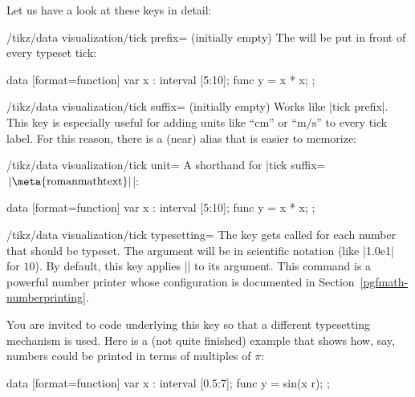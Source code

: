 Let us have a look at these keys in detail:

\begin{key}{/tikz/data visualization/tick prefix= (initially \normalfont empty)}
    The  will be put in front of every typeset tick:
\begin{codeexample}[]
\tikz \datavisualization
  [scientific axes, all axes={ticks=few, length=2.5cm},
   x axis={ticks={tick prefix=$\langle$, tick suffix=$]$}},
   visualize as line]
  data [format=function] {
    var x : interval [5:10];
    func y = \value x * \value x;
  };
\end{codeexample}
\end{key}

\begin{key}{/tikz/data visualization/tick suffix= (initially \normalfont empty)}
    Works like |tick prefix|. This key is especially useful for adding units
    like ``cm'' or ``$\mathrm m/\mathrm s$'' to every tick label. For this
    reason, there is a (near) alias that is easier to memorize:
    \begin{key}{/tikz/data visualization/tick unit=}
        A shorthand for |tick suffix={$\,\rm|\meta{roman math text}|$}|:
\begin{codeexample}[]
\tikz \datavisualization
  [scientific axes, all axes={length=3cm},
   x axis={ticks={tick unit=s}},
   y axis={ticks={tick unit=m/s^2}},
   visualize as line]
  data [format=function] {
    var x : interval [5:10];
    func y = \value x * \value x;
  };
\end{codeexample}
    \end{key}
\end{key}

\begin{key}{/tikz/data visualization/tick typesetting=}
    The key gets called for each number that should be typeset. The argument
     will be in scientific notation (like |1.0e1| for $10$). By
    default, this key applies |\pgfmathprintnumber| to its argument. This
    command is a powerful number printer whose configuration is documented in
    Section~\ref{pgfmath-numberprinting}.

    You are invited to code underlying this key so that a different typesetting
    mechanism is used. Here is a (not quite finished) example that shows how,
    say, numbers could be printed in terms of multiples of $\pi$:
\begin{codeexample}[]
\def\mytypesetter#1{%
  \pgfmathparse{#1/pi}%
  \pgfmathprintnumber{\pgfmathresult}$\pi$%
}
\tikz \datavisualization
  [school book axes, all axes={unit length=1.25cm},
   x axis={ticks={step=(0.5*pi), tick typesetter/.code=\mytypesetter{##1}}},
   y axis={include value={-1,1}},
   visualize as smooth line]
  data [format=function] {
    var x : interval [0.5:7];
    func y = sin(\value x r);
  };
\end{codeexample}
\end{key}


